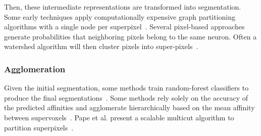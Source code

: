 Then, these intermediate representations are transformed into segmentation.
Some early techniques apply computationally expensive graph partitioning algorithms with a single node per superpixel~\cite{andres2012globally}.
Several pixel-based approaches generate probabilities that neighboring pixels belong to the same neuron.
Often a watershed algorithm will then cluster pixels into super-pixels~\cite{zlateski2015image}.

\subsubsection{Agglomeration}
Given the initial segmentation, some methods train random-forest classifiers to produce the final segmentations~\cite{seymour2016rhoananet,nunez2014graph,parag2017anisotropic,zlateski2015image,10.1371/journal.pone.0125825}.
Some methods rely solely on the accuracy of the predicted affinities and agglomerate hierarchically based on the mean affinity between supervoxels~\cite{lee2017superhuman,funke2017deep}.
Pape et al. present a scalable multicut algorithm to partition superpixels~\cite{beier2017multicut}.
 ~\cite{jain2011learning,bogovic2013learned}

